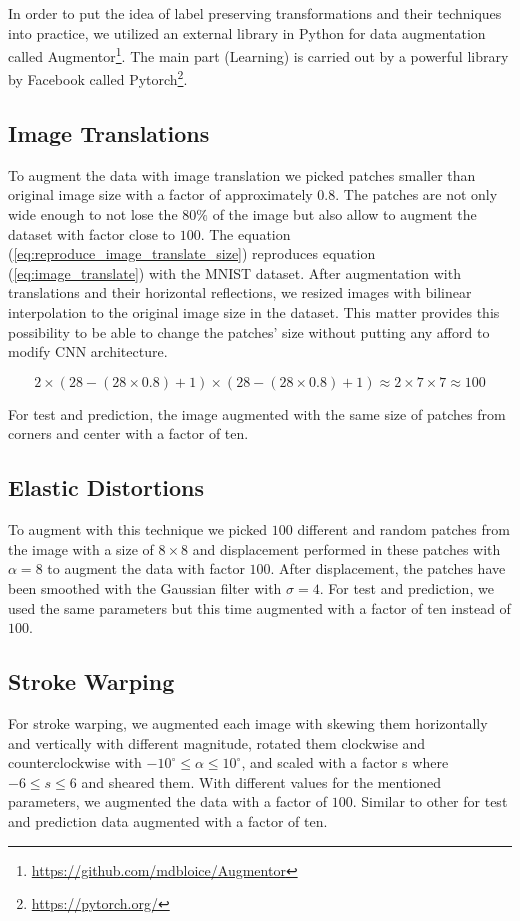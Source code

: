 In order to put the idea of label preserving transformations and their techniques
into practice, we utilized an external library in Python for data augmentation called
Augmentor\footnote{\url{https://github.com/mdbloice/Augmentor}}. The main part (Learning) is carried
out by a powerful library by Facebook called Pytorch\footnote{\url{https://pytorch.org/}}.

\subsection{Image Translations}
To augment the data with image translation we picked patches smaller than original image size with
a factor of approximately $0.8$. The patches are not only wide enough to not lose the $80\%$ of the image but
also allow to augment the dataset with factor close to $100$. The equation
(\ref{eq:reproduce_image_translate_size}) reproduces equation (\ref{eq:image_translate}) with
the MNIST dataset. After augmentation with translations and their horizontal reflections, we resized images with bilinear interpolation to the original image size in the dataset. This matter provides this possibility to be able to change the patches' size without putting any afford to modify CNN architecture.

\begin{equation}
  \label{eq:reproduce_image_translate_size}
  2\times(28-(28 \times 0.8)+1)\times(28-(28 \times 0.8)+1) \approx 2 \times 7 \times 7 \approx 100
\end{equation}

For test and prediction, the image augmented with the same size of patches from corners and center
with a factor of ten.

\subsection{Elastic Distortions}
To augment with this technique we picked $100$ different and random patches from the image with a
size of $8 \times 8$ and displacement performed in these patches with $\alpha = 8$ to augment the
data with factor $100$.  After displacement, the patches have been smoothed with the Gaussian filter
with $\sigma = 4$. For test and prediction, we used the same parameters but this time augmented with
a factor of ten instead of $100$.

\subsection{Stroke Warping}
For stroke warping, we augmented each image with skewing them horizontally and vertically with
different magnitude, rotated them clockwise and counterclockwise with $-10^{\circ} \leq \alpha \leq
  10^{\circ}$, and scaled with a factor s where $-6 \leq s \leq 6$  and sheared them. With different
values for the mentioned parameters, we augmented the data with a factor of $100$. Similar to other
for test and prediction data augmented with a factor of ten.

